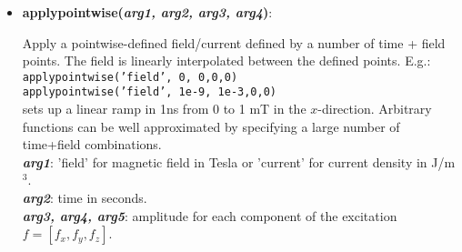 \begin{itemize}
%

 \item {\vspace{-0.4cm}\textbf{applypointwise(\textit{arg1, arg2, arg3, arg4})}: 
				\flushright\parbox{0.9 \textwidth}{\vspace{-0.25cm} 
				Apply a pointwise-defined field/current defined by a number of time + field points.  The field is linearly interpolated between the defined points.	E.g.:\\ 
				\qquad\texttt{applypointwise('field', 0, 0,0,0)}\\
				\qquad\texttt{applypointwise('field', 1e-9, 1e-3,0,0)} \\
				sets up a linear ramp in 1ns from 0 to 1 mT in the $x$-direction.  Arbitrary functions can be well approximated by specifying a large number of time+field combinations.\\
				\textbf{\textit{arg1}}: 'field' for magnetic field in Tesla or 'current' for current density in J/m$^3$.\\
				\textbf{\textit{arg2}}: time in seconds.\\
				\textbf{\textit{arg3, arg4, arg5}}: amplitude for each component of the excitation $f = [f_x, f_y, f_z]$.
				}\flushleft}


\end{itemize}
